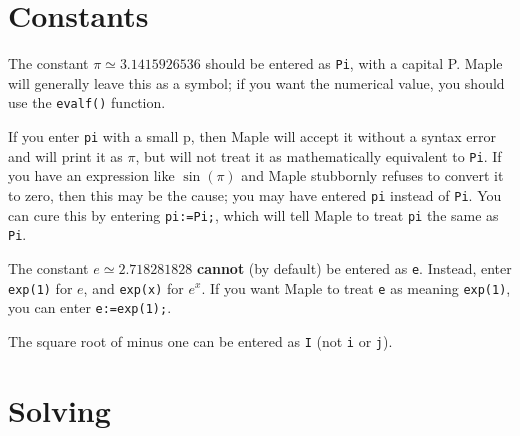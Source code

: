 \documentclass{amsart}
\begin{document}
\section{Constants}



\begin{secenum}
%
 \item\label{pi} The constant $\pi\simeq 3.1415926536$ should be entered as
  \verb~Pi~, with a capital P.  Maple will generally leave this as a
  symbol; if you want the numerical value, you should use the
  \verb~evalf()~ function. 
%
 \item\label{badpi}
  If you enter \verb~pi~ with a small p, then Maple will accept it
  without a syntax error and will print it as $\pi$, but will not
  treat it as mathematically equivalent to \verb~Pi~.  If you have an
  expression like $\sin(\pi)$ and Maple stubbornly refuses to convert
  it to zero, then this may be the cause; you may have entered
  \verb~pi~ instead of \verb~Pi~.  You can cure this by entering
  \verb~pi:=Pi;~, which will tell Maple to treat \verb~pi~ the same
  as \verb~Pi~. 
%
 \item\label{exp} The constant $e\simeq 2.718281828$ \textbf{cannot} (by default)
  be entered as \verb~e~.  Instead, enter \verb~exp(1)~ for $e$, and
  \verb~exp(x)~ for $e^x$.  If you want Maple to treat \verb~e~ as
  meaning \verb~exp(1)~, you can enter \verb~e:=exp(1);~. 
%
 \item\label{imaginary} The square root of minus one can be
  entered as \verb~I~ (not \verb~i~ or \verb~j~).  
\end{secenum}

\section{Solving}
\end{document}

